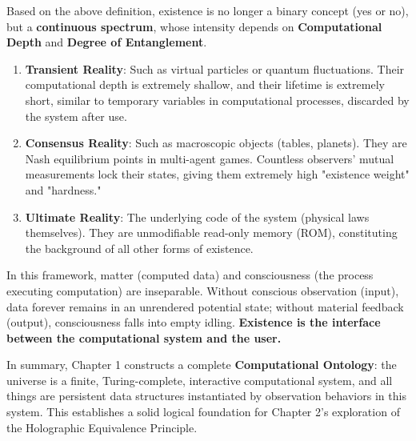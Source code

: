 Based on the above definition, existence is no longer a binary concept (yes or no), but a \textbf{continuous spectrum}, whose intensity depends on \textbf{Computational Depth} and \textbf{Degree of Entanglement}.

\begin{enumerate}
\item \textbf{Transient Reality}: Such as virtual particles or quantum fluctuations. Their computational depth is extremely shallow, and their lifetime is extremely short, similar to temporary variables in computational processes, discarded by the system after use.

\item \textbf{Consensus Reality}: Such as macroscopic objects (tables, planets). They are Nash equilibrium points in multi-agent games. Countless observers' mutual measurements lock their states, giving them extremely high "existence weight" and "hardness."

\item \textbf{Ultimate Reality}: The underlying code of the system (physical laws themselves). They are unmodifiable read-only memory (ROM), constituting the background of all other forms of existence.
\end{enumerate}

\begin{corollary}
In this framework, matter (computed data) and consciousness (the process executing computation) are inseparable. Without conscious observation (input), data forever remains in an unrendered potential state; without material feedback (output), consciousness falls into empty idling. \textbf{Existence is the interface between the computational system and the user.}
\end{corollary}

In summary, Chapter 1 constructs a complete \textbf{Computational Ontology}: the universe is a finite, Turing-complete, interactive computational system, and all things are persistent data structures instantiated by observation behaviors in this system. This establishes a solid logical foundation for Chapter 2's exploration of the Holographic Equivalence Principle.
